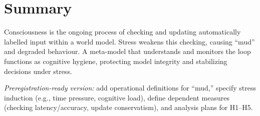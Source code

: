 \documentclass[11pt,a4paper]{article}
\begin{document}
\section{Summary}
Consciousness is the ongoing process of checking and updating automatically labelled input within a world model. Stress weakens this checking, causing ``mud'' and degraded behaviour. A meta-model that understands and monitors the loop functions as cognitive hygiene, protecting model integrity and stabilizing decisions under stress.

\vfill
\noindent\textit{Preregistration-ready version:} add operational definitions for ``mud,'' specify stress induction (e.g., time pressure, cognitive load), define dependent measures (checking latency/accuracy, update conservatism), and analysis plans for H1--H5.
\end{document}
